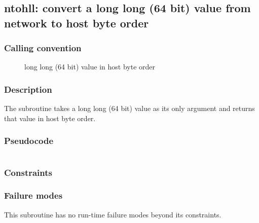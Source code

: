 \clearpage
{}
{}
\label{subr:ntohll}
\subsection*{ntohll: convert a long long (64 bit) value from network
  to host byte order}

\subsubsection*{Calling convention}

\begin{description}
\item[] long long (64 bit) value in host byte order
\end{description}

\subsubsection*{Description}

The  subroutine takes a long long (64 bit) value as
its only argument and returns that value in host byte order.
\subsubsection*{Pseudocode}

\begin{verbatim}
\end{verbatim}

\subsubsection*{Constraints}

\subsubsection*{Failure modes}

This subroutine has no run-time failure modes beyond its constraints.
